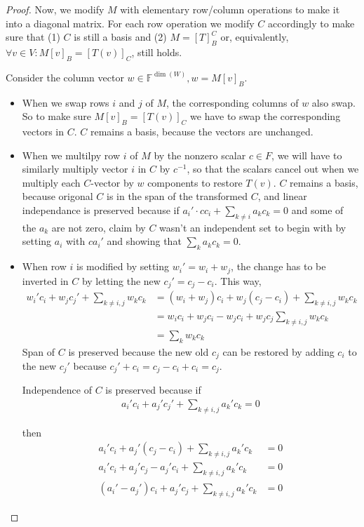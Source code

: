 \documentclass[12pt]{article} %
\newcommand{\F}{\mathbb{F}}
\begin{document}
\begin{flushleft}
\begin{proof}
  Now, we modify $M$ with elementary row/column operations to make it into a diagonal matrix. For each row operation we modify $C$ accordingly to make sure that (1) $C$ is still a basis and (2) $M=[T]_B^C$ or, equivalently, $\forall v\in V: M[v]_B = [T(v)]_C$, still holds.

  Consider the column vector $w\in \F^{\dim(W)}, w=M[v]_B$.
  \begin{itemize}
  \item When we swap rows $i$ and $j$ of $M$, the corresponding columns of $w$ also swap. So to make sure $M[v]_B=[T(v)]_C$ we have to swap the corresponding vectors in $C$. $C$ remains a basis, because the vectors are unchanged.
  
  \item When we multilpy row $i$ of $M$ by the nonzero scalar $c\in F$, we will have to similarly multiply vector $i$ in $C$ by $c^{-1}$, so that the scalars cancel out when we multiply each $C$-vector by $w$ components to restore $T(v)$. $C$ remains a basis, because origonal $C$ is in the span of the transformed $C$, and linear independance is preserved because if $a_i' \cdot cc_i + \sum_{k\neq i} a_k c_k = 0$ and some of the $a_k$ are not zero, claim by $C$ wasn't an independent set to begin with by setting $a_i$ with $ca_i'$ and showing that $\sum_k a_kc_k = 0$.
  
  \item When row $i$ is modified by setting $w_i' = w_i + w_j$, the change has to be inverted in $C$ by letting the new $c_j'=c_j - c_i$. This way,
  \begin{align*}
    w_i' c_i + w_j c_j' + \sum_{k\neq i,j} w_k c_k &= (w_i+w_j)c_i + w_j(c_j-c_i) + \sum_{k\neq i,j} w_kc_k\\
    &= w_ic_i + w_jc_i - w_jc_i + w_jc_j \sum_{k\neq i, j} w_kc_k\\
    &= \sum_{k} w_kc_k
  \end{align*}
  Span of $C$ is preserved because the new old $c_j$ can be restored by adding $c_i$ to the new $c_j'$ because $c_j' + c_i = c_j - c_i + c_i = c_j$.
  
  Independence of $C$ is preserved because if
  \begin{align*}
    a_i' c_i + a_j' c_j' + \sum_{k\neq i, j} a_k' c_k = 0
  \end{align*}

  then
  \begin{align*}
    a_i' c_i + a_j' (c_j - c_i) + \sum_{k\neq i, j} a_k' c_k &= 0\\
    a_i' c_i + a_j' c_j - a_j' c_i + \sum_{k\neq i, j} a_k'c_k &=0\\
    (a_i' - a_j') c_i + a_j' c_j  + \sum_{k\neq i, j} a_k'c_k &=0
  \end{align*}
  

\end{itemize}
\end{proof}
\end{flushleft}
\end{document}
